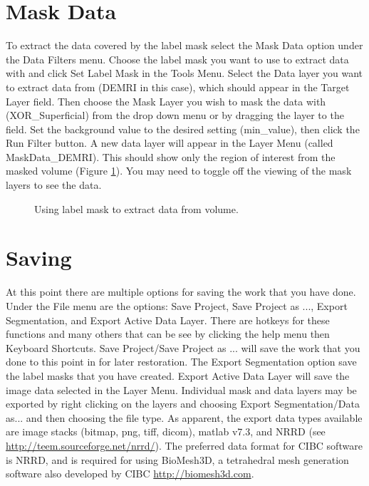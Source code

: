 \documentclass[fleqn,11pt,openany]{book}
\begin{document}
\section{Mask Data}

To extract the data covered by the label mask select the Mask Data option under the Data Filters menu.  Choose the label mask you want to use to extract data with and click Set Label Mask in the Tools Menu.  Select the Data layer you want to extract data from (DEMRI in this case), which should appear in the Target Layer field.  Then choose the Mask Layer you wish to mask the data with (XOR\_Superficial) from the drop down menu or by dragging the layer to the field.  Set the background value to the desired setting (min\_value), then click the Run Filter button.  A new data layer will appear in the Layer Menu (called MaskData\_DEMRI).  This should show only the region of interest from the masked volume (Figure \ref{fig:maskdata}).  You may need to toggle off the viewing of the mask layers to see the data.

\begin{figure}
\caption{Using label mask to extract data from volume.}\label{fig:maskdata}
\end{figure}


\section{Saving}

At this point there are multiple options for saving the work that you have done.  Under the File menu are the options: Save Project, Save Project as ..., Export Segmentation, and Export Active Data Layer.  There are hotkeys for these functions and many others that can be see by clicking the help menu then Keyboard Shortcuts.  Save Project/Save Project as ... will save the work that you done to this point in for later restoration.  The Export Segmentation option save the label masks that you have created.   Export Active Data Layer will save the image data selected in the Layer Menu.  Individual mask and data layers may be exported by right clicking on the layers and choosing Export Segmentation/Data as... and then choosing the file type.  As apparent, the export data types available are image stacks (bitmap, png, tiff, dicom), matlab v7.3, and NRRD (see \url{http://teem.sourceforge.net/nrrd/}).  The preferred data format for CIBC software is NRRD, and is required for using BioMesh3D, a tetrahedral mesh generation software also developed by CIBC \url{http://biomesh3d.com}.
  
\end{document}
